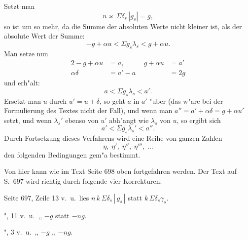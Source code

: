 \documentclass[12pt,a4paper]{article}
\begin{document}
\noindent
Setzt man
\[n\varkappa\,\Sigma\delta_s\,|g_s| = g,\]
so ist um so mehr, da die Summe der absoluten Werte nicht kleiner ist, als der absolute Wert der Summe:
\begin{equation}
\tag{14}
-g + \alpha u < \Sigma g_s\lambda_s < g + \alpha u.
\end{equation}
Man setze nun
\begin{alignat*}{2}
-g + \alpha u &= a,\qquad & g + \alpha u &= a'\\
\alpha\delta &= a' - a &&= 2g
\end{alignat*}
und erh"alt:
\begin{equation}
\tag{15}
a < \Sigma g_s\lambda_s < a'.
\end{equation}
Ersetzt man $u$ durch $u' = u + \delta$, so geht $a$ in $a'$ "uber (das w"are bei der Formulierung des Textes nicht der Fall), und wenn man $a'' = a' + \alpha\delta = g + \alpha u'$ setzt, und wenn $\lambda_s'$ ebenso von $u'$ abh"angt wie $\lambda_s$ von $u$, so ergibt sich
\[a' < \Sigma g_s\lambda_s' < a''.\]
Durch Fortsetzung dieses Verfahrens wird eine Reihe von ganzen Zahlen
\[\eta,\; \eta',\; \eta'',\; \eta''',\; \dots\]
den folgenden Bedingungen gem"a{\/} bestimmt.

Von hier kann wie im Text Seite 698 oben fortgefahren werden. Der Text auf S.~697 wird richtig durch folgende vier Korrekturen:

\medskip

\noindent
Seite 697, Zeile 13 v.~u.\ lies $n\,k\,\Sigma\delta_s\,|\,g_s\,|$ statt $k\,\Sigma\delta_s\gamma_s$.

\smallskip

\noindent\hspace*{5.5em}",\hspace{1.5em} \hspace{0.8em}11 v.~u.\ \hspace{0.5em},,\hspace{0.5em} $-g$ statt $-ng$.

\smallskip

\noindent\hspace*{5.5em}",\hspace{1.5em} \hspace{0.8em}\hspace{0.2em}3 v.~u.\ \hspace{0.5em},,\hspace{0.5em} $-g$ \hspace{1.5em},,\hspace{0.5em} $-ng$.
\end{document}
